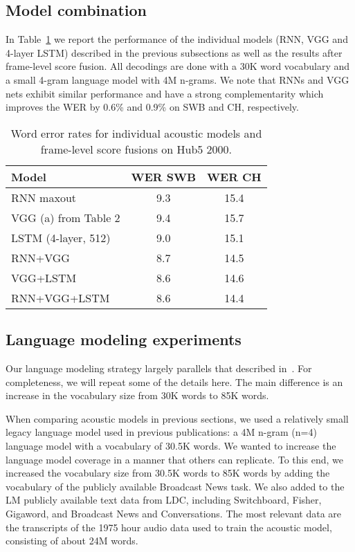 \documentclass[a4paper]{article}
\begin{document}
\subsection{Model combination}
In Table~\ref{comb} we report the performance of the individual models (RNN, VGG and 4-layer LSTM)
described in the previous subsections as well as the results after
frame-level score fusion. All decodings are done with a 30K word
vocabulary and a small 4-gram language model with 4M n-grams. We note
that RNNs and VGG nets exhibit similar performance and have a strong
complementarity which improves the WER by 0.6\% and 0.9\% on SWB and
CH, respectively.


\begin{table}[htpb!]
\begin{center}
\begin{tabular}{|l|c|c|} \hline
     Model   & WER SWB & WER CH      \\ \hline
RNN maxout   & 9.3 & 15.4        \\ \hline
VGG (a) from Table 2 & 9.4 & 15.7 \\ \hline
LSTM (4-layer, 512) & 9.0 & 15.1 \\ \hline
RNN+VGG      & 8.7 & 14.5 \\ \hline
VGG+LSTM     & 8.6 & 14.6 \\ \hline
RNN+VGG+LSTM & 8.6 & 14.4 \\ \hline
\end{tabular}
\end{center}
\caption{\label{comb}
Word error rates for individual acoustic models and frame-level score fusions on Hub5 2000.}
\end{table}

\subsection{Language modeling experiments}
\label{LM}

Our language modeling strategy largely parallels that described
in~\cite{saon15}.  For completeness, we will repeat some of the
details here.  The main difference is an increase in the vocabulary
size from 30K words to 85K words.

When comparing acoustic models in previous sections, we used a
relatively small legacy language model used in previous publications:
a 4M n-gram (n=4) language model with a vocabulary of 30.5K words.
We wanted to increase the language model coverage in a manner that
others can replicate.  To this end, we increased the vocabulary size
from 30.5K words to 85K words by adding the vocabulary of the publicly
available Broadcast News task.  We also added to the LM publicly
available text data from LDC, including Switchboard, Fisher, Gigaword,
and Broadcast News and Conversations.  The most relevant data are the
transcripts of the 1975 hour audio data used to train the acoustic
model, consisting of about 24M words.
\end{document}
